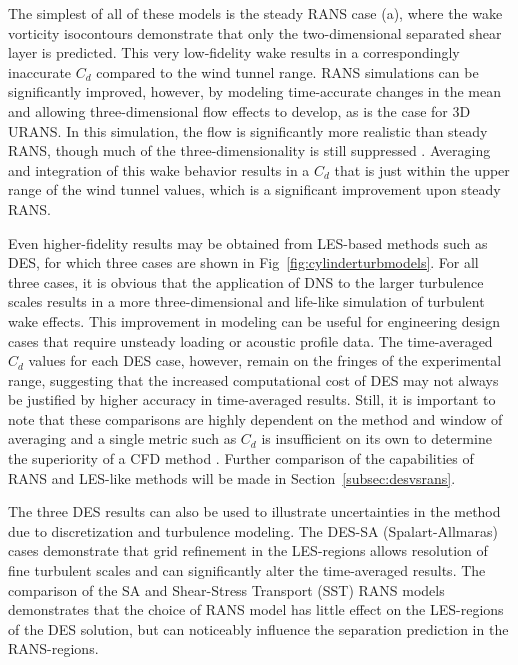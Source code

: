 \documentclass[journal]{new-aiaa}
\begin{document}
The simplest of all of these models is the steady RANS case (a), where the wake vorticity isocontours demonstrate that only the two-dimensional separated shear layer is predicted. This very low-fidelity wake results in a correspondingly inaccurate $C_d$ compared to the wind tunnel range. RANS simulations can be significantly improved, however, by modeling time-accurate changes in the mean and allowing three-dimensional flow effects to develop, as is the case for 3D URANS.  In this simulation, the flow is significantly more realistic than steady RANS, though much of the three-dimensionality is still suppressed \cite{spalart2009detachededdy}.  Averaging and integration of this wake behavior results in a $C_d$ that is just within the upper range of the wind tunnel values, which is a significant improvement upon steady RANS.



Even higher-fidelity results may be obtained from LES-based methods such as DES, for which three cases are shown in Fig~\ref{fig:cylinderturbmodels}. For all three cases, it is obvious that the application of DNS to the larger turbulence scales results in a more three-dimensional and life-like simulation of turbulent wake effects. This improvement in modeling can be useful for engineering design cases that require unsteady loading or acoustic profile data. The time-averaged $C_d$ values for each DES case, however, remain on the fringes of the experimental range, suggesting that the increased computational cost of DES may not always be justified by higher accuracy in time-averaged results. Still, it is important to note that these comparisons are highly dependent on the method and window of averaging and a single metric such as $C_d$ is insufficient on its own to determine the superiority of a CFD method \cite{travin2000detachededdy}. Further comparison of the capabilities of RANS and LES-like methods will be made in Section~\ref{subsec:desvsrans}.




The three DES results can also be used to illustrate uncertainties in the method due to discretization and turbulence modeling. The DES-SA (Spalart-Allmaras) cases demonstrate that grid refinement in the LES-regions allows resolution of fine turbulent scales and can significantly alter the time-averaged results. The comparison of the SA and Shear-Stress Transport (SST) RANS models demonstrates that the choice of RANS model has little effect on the LES-regions of the DES solution, but can noticeably influence the separation prediction in the RANS-regions.
\end{document}
